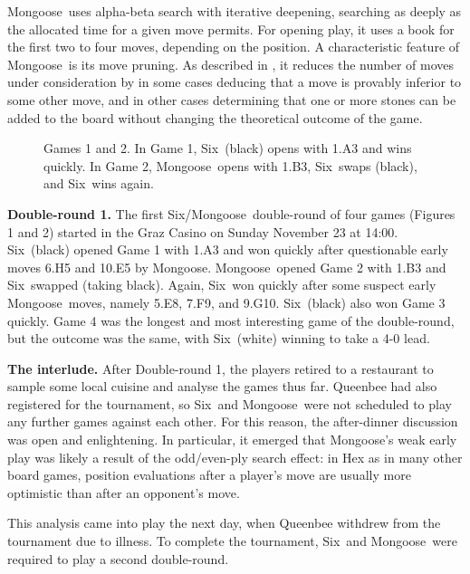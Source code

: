 \documentclass[12pt]{article}
\def\Six{{\sc Six}}
\def\Mg{{\sc Mongoose}}
\begin{document}
\Mg\ uses alpha-beta search with iterative deepening,
searching as deeply as the allocated time for a given move permits.
For opening play, it uses a book for the first two to four moves,
depending on the position.
A characteristic feature of \Mg\ is its move pruning.
As described in \cite{HB03}, it reduces the number of moves 
under consideration by in some cases
deducing that a move is provably inferior to some other move,
and in other cases determining
that one or more stones can be added to the board
without changing the theoretical outcome of the game.

\begin{figure}\label{fig1}
\hspace*{-.2in}
\caption{Games 1 and 2.
In Game 1, \Six\ (black) opens with 1.A3 and wins quickly.
In Game 2, \Mg\ opens with 1.B3, \Six\ swaps (black), and \Six\ wins again.}
\end{figure}

{\noindent\large\bf Double-round 1.}
The first \Six/\Mg\ double-round of four games (Figures 1 and 2)
started in the Graz Casino on Sunday November 23 at 14:00.
\Six\ (black) opened Game 1 with 1.A3
and won quickly after questionable early moves 6.H5 and 10.E5 by \Mg.
\Mg\ opened Game 2 with 1.B3 and \Six\ swapped (taking black).
Again, \Six\ won quickly after some suspect early \Mg\ moves,
namely 5.E8, 7.F9, and 9.G10.
\Six\ (black) also  won Game 3 quickly.
Game 4 was the longest and most interesting game of the double-round,
but the outcome was the same, 
with \Six\ (white) winning to take a 4-0 lead.

{\noindent\large\bf The interlude.}
After Double-round 1, the players retired to a restaurant 
to sample some local cuisine and analyse the games thus far.
{\sc Queenbee} had also registered for the tournament,
so \Six\ and \Mg\ were not scheduled to play any further games 
against each other.
For this reason, the after-dinner discussion was open and enlightening.
In particular, it emerged that \Mg's weak early play
was likely a result of the odd/even-ply search effect:
in Hex as in many other board games,
position evaluations after a player's move are 
usually more optimistic than after an opponent's move.

This analysis came into play the next day,
when {\sc Queenbee} withdrew from the tournament due to illness.
To complete the tournament, \Six\ and \Mg\ were
required to play a second double-round.
\end{document}

